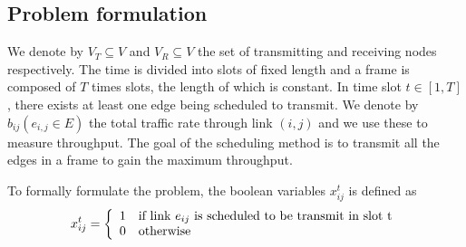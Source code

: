 \documentclass[conference]{IEEEtran}
\begin{document}
\subsection{Problem formulation}
We denote by $V_T\subseteq V$ and $V_R\subseteq V$ the set of
transmitting and receiving nodes respectively. The time is divided
into slots of fixed length and a frame is composed of $T$ times
slots, the length of which is constant. In time slot $t\in [1,T]$,
there exists at least one edge being scheduled to transmit. We
denote by $b_{ij} (e_{i,j}\in E)$ the total traffic rate through
link $(i,j)$ and we use these to measure throughput. The goal of the
scheduling method is to transmit all the edges in a frame to gain
the maximum throughput.

To formally formulate the problem, the boolean variables $x_{ij}^t$
is defined as
\begin{displaymath} \label{blean varible x}
x_{ij}^t = \left\{
\begin{array}{ll}
1 & \mbox{if link}\,\, e_{ij} \,\,\mbox{is scheduled to be transmit in slot}\,\,$t$\\
0 & \mbox{otherwise}
\end{array}
\right.
\end{displaymath}
\end{document}
